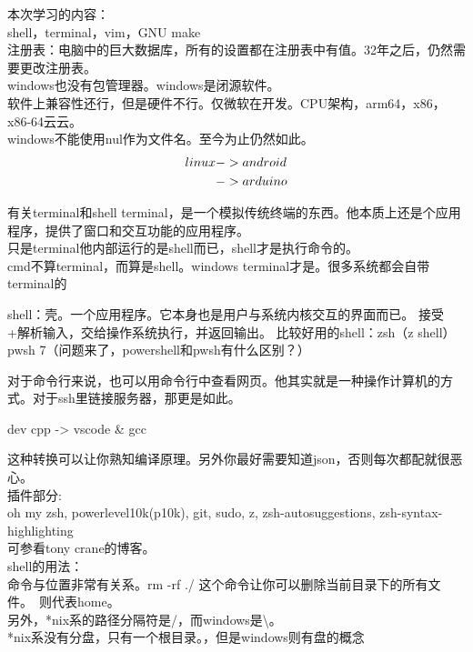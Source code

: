 \documentclass{article}
\begin{document}
\noindent
本次学习的内容：\\
shell，terminal，vim，GNU make\\

\noindent
注册表：电脑中的巨大数据库，所有的设置都在注册表中有值。32年之后，仍然需要更改注册表。\\
windows也没有包管理器。windows是闭源软件。\\
软件上兼容性还行，但是硬件不行。仅微软在开发。CPU架构，arm64，x86，x86-64云云。\\
windows不能使用nul作为文件名。至今为止仍然如此。\\
\begin{align}
    linux & ->android \notag   \\
          & ->arduino   \notag
\end{align}

\noindent
有关terminal和shell
terminal，是一个模拟传统终端的东西。他本质上还是个应用程序，提供了窗口和交互功能的应用程序。\\
只是terminal他内部运行的是shell而已，shell才是执行命令的。\\
cmd不算terminal，而算是shell。windows terminal才是。很多系统都会自带terminal的

\noindent
shell：壳。一个应用程序。它本身也是用户与系统内核交互的界面而已。
接受+解析输入，交给操作系统执行，并返回输出。
比较好用的shell：zsh（z shell）
pwsh 7（问题来了，powershell和pwsh有什么区别？）

\noindent
对于命令行来说，也可以用命令行中查看网页。他其实就是一种操作计算机的方式。对于ssh里链接服务器，那更是如此。\\
\begin{center}
    dev cpp -> vscode \& gcc\\
\end{center}
这种转换可以让你熟知编译原理。另外你最好需要知道json，否则每次都配就很恶心。\\

\noindent
插件部分:\\
oh my zsh, powerlevel10k(p10k), git, sudo, z, zsh-autosuggestions, zsh-syntax-highlighting\\
可参看tony crane的博客。\\

\noindent
shell的用法：\\
命令与位置非常有关系。rm -rf ./ 这个命令让你可以删除当前目录下的所有文件。~则代表home。\\
另外，*nix系的路径分隔符是/，而windows是\textbackslash。\\
*nix系没有分盘，只有一个根目录。，但是windows则有盘的概念\\
\end{document}
